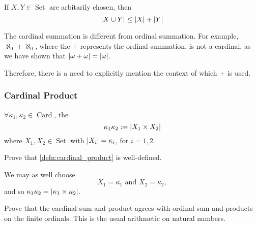 \documentclass[notoc,notitlepage]{tufte-book}
\DeclareMathOperator{\Card}{Card }
\DeclareMathOperator{\Set}{Set }
\begin{document}
\begin{note}
  If $X, Y \in \Set$ are arbitarily chosen, then
  \begin{equation*}
    \left|X \cup Y\right| \leq \left|X\right| + \left|Y\right|
  \end{equation*}
\end{note}

\begin{warning}
  The cardinal summation is different from ordinal summation. For example, $\aleph_0 + \aleph_0$, where the $+$ represents the ordinal summation, is not a cardinal, as we have shown that $\left|\omega + \omega\right| = \left|\omega\right|$.

  Therefore, there is a need to explicitly mention the context of which $+$ is used.
\end{warning}


\subsubsection{Cardinal Product}%
\label{ssub:cardinal_product}

\begin{defn}\label{defn:cardinal_product}
  $\forall \kappa_1, \kappa_2 \in \Card$, the 
  \begin{equation*}
    \kappa_1 \kappa_2 := \left|X_1 \times X_2\right|
  \end{equation*}
  where $X_1, X_2 \in \Set$ with $\left|X_i\right| = \kappa_i$, for $i = 1, 2$.
\end{defn}

\begin{ex}
  Prove that \cref{defn:cardinal_product} is well-defined.
\end{ex}

\begin{remark}
  We may as well choose
  \begin{equation*}
    X_1 = \kappa_1 \text{ and } X_2 = \kappa_2,
  \end{equation*}
  and so $\kappa_1 \kappa_2 = \left|\kappa_1 \times \kappa_2\right|$.
\end{remark}


\begin{ex}
  Prove that the cardinal sum and product agrees with ordinal sum and products on the finite ordinals. This is the usual arithmetic on natural numbers.
\end{ex}
\end{document}
